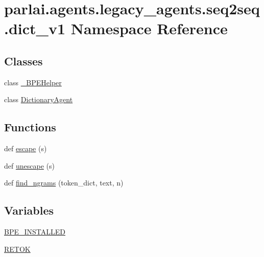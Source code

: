 \hypertarget{namespaceparlai_1_1agents_1_1legacy__agents_1_1seq2seq_1_1dict__v1}{}\section{parlai.\+agents.\+legacy\+\_\+agents.\+seq2seq.\+dict\+\_\+v1 Namespace Reference}
\label{namespaceparlai_1_1agents_1_1legacy__agents_1_1seq2seq_1_1dict__v1}
\subsection*{Classes}
\begin{DoxyCompactItemize}
\item 
class \hyperlink{classparlai_1_1agents_1_1legacy__agents_1_1seq2seq_1_1dict__v1_1_1__BPEHelper}{\+\_\+\+B\+P\+E\+Helper}
\item 
class \hyperlink{classparlai_1_1agents_1_1legacy__agents_1_1seq2seq_1_1dict__v1_1_1DictionaryAgent}{Dictionary\+Agent}
\end{DoxyCompactItemize}
\subsection*{Functions}
\begin{DoxyCompactItemize}
\item 
def \hyperlink{namespaceparlai_1_1agents_1_1legacy__agents_1_1seq2seq_1_1dict__v1_a780f6055b01f2cffa03c670159317ee0}{escape} (s)
\item 
def \hyperlink{namespaceparlai_1_1agents_1_1legacy__agents_1_1seq2seq_1_1dict__v1_affad139ddec76996dc9a93f6123d545e}{unescape} (s)
\item 
def \hyperlink{namespaceparlai_1_1agents_1_1legacy__agents_1_1seq2seq_1_1dict__v1_ac37e7654855b4cdf9b8a6cb1a2193a17}{find\+\_\+ngrams} (token\+\_\+dict, text, n)
\end{DoxyCompactItemize}
\subsection*{Variables}
\begin{DoxyCompactItemize}
\item 
\hyperlink{namespaceparlai_1_1agents_1_1legacy__agents_1_1seq2seq_1_1dict__v1_abbbcb24730358ec013ea65e5e562ec97}{B\+P\+E\+\_\+\+I\+N\+S\+T\+A\+L\+L\+ED}
\item 
\hyperlink{namespaceparlai_1_1agents_1_1legacy__agents_1_1seq2seq_1_1dict__v1_ad5b8a872f88a18dabce2f713af40ac66}{R\+E\+T\+OK}
\end{DoxyCompactItemize}


